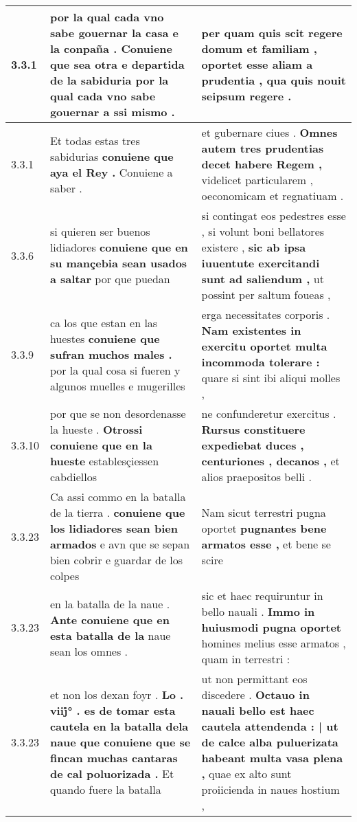 \begin{tabular}{|p{1cm}|p{6.5cm}|p{6.5cm}|}
3.3.1 & por la qual cada vno sabe gouernar la casa e la conpaña . \textbf{ Conuiene que sea otra e departida de la sabiduria } por la qual cada vno sabe gouernar a ssi mismo . & per quam quis scit regere domum et familiam , \textbf{ oportet esse aliam a prudentia , } qua quis nouit seipsum regere . \\\hline
3.3.1 & Et todas estas tres sabidurias \textbf{ conuiene que aya el Rey . } Conuiene a saber . & et gubernare ciues . \textbf{ Omnes autem tres prudentias decet habere Regem , } videlicet particularem , oeconomicam et regnatiuam . \\\hline
3.3.6 & si quieren ser buenos lidiadores \textbf{ conuiene que en su mançebia sean usados a saltar } por que puedan & si contingat eos pedestres esse , si volunt boni bellatores existere , \textbf{ sic ab ipsa iuuentute exercitandi sunt ad saliendum , } ut possint per saltum foueas , \\\hline
3.3.9 & ca los que estan en las huestes \textbf{ conuiene que sufran muchos males . } por la qual cosa si fueren y algunos muelles e mugerilles & erga necessitates corporis . \textbf{ Nam existentes in exercitu oportet multa incommoda tolerare : } quare si sint ibi aliqui molles , \\\hline
3.3.10 & por que se non desordenasse la hueste . \textbf{ Otrossi conuiene que en la hueste } establesçiessen cabdiellos & ne confunderetur exercitus . \textbf{ Rursus constituere expediebat duces , centuriones , decanos , } et alios praepositos belli . \\\hline
3.3.23 & Ca assi commo en la batalla de la tierra . \textbf{ conuiene que los lidiadores sean bien armados } e avn que se sepan bien cobrir e guardar de los colpes & Nam sicut terrestri pugna oportet \textbf{ pugnantes bene armatos esse , } et bene se scire \\\hline
3.3.23 & en la batalla de la naue . \textbf{ Ante conuiene que en esta batalla de la } naue sean los omnes . & sic et haec requiruntur in bello nauali . \textbf{ Immo in huiusmodi pugna oportet } homines melius esse armatos , quam in terrestri : \\\hline
3.3.23 & et non los dexan foyr . \textbf{ Lo . viij̇° . es de tomar esta cautela en la batalla dela naue que conuiene que se fincan muchas cantaras de cal poluorizada . } Et quando fuere la batalla & ut non permittant eos discedere . \textbf{ Octauo in nauali bello est haec cautela attendenda : | ut de calce alba puluerizata habeant multa vasa plena , } quae ex alto sunt proiicienda in naues hostium , \\\hline

\end{tabular}
